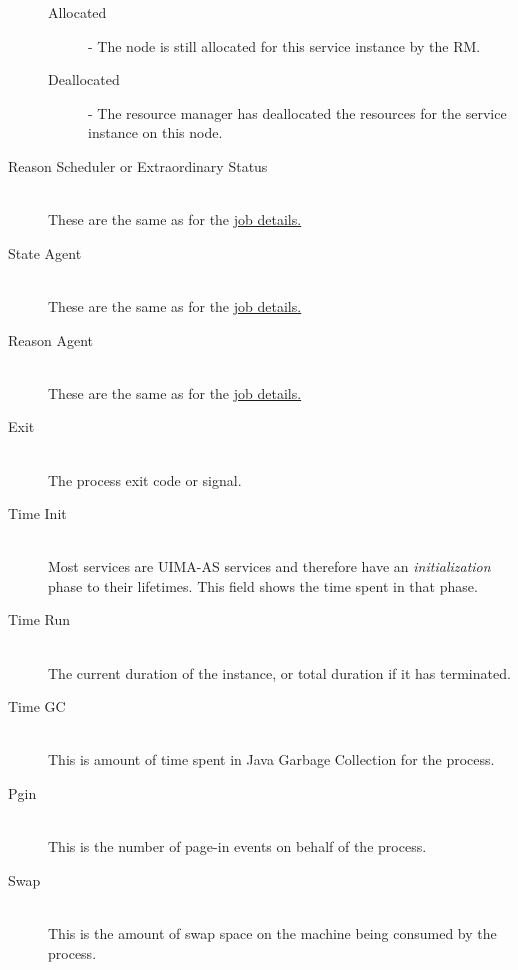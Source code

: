 \begin{description}
        \begin{description}
            \item[Allocated] - The node is still allocated for this service instance by the RM.
            \item[Deallocated] - The resource manager has deallocated the resources for the service instance on
              this node.
        \end{description}
        
      \item[Reason Scheduler or Extraordinary Status] \hfill \\
        These are the same as for the \hyperref[itm:job-details-sched]{job details.}

      \item[State Agent] \hfill \\
        These are the same as for the \hyperref[itm:job-details-state]{job details.}

      \item[Reason Agent] \hfill \\
        These are the same as for the \hyperref[itm:job-details-agent]{job details.}

      \item[Exit] \hfill \\
        The process exit code or signal.

      \item[Time Init] \hfill \\
        Most services are UIMA-AS services and therefore have an {\em initialization} phase
        to their lifetimes.  This field shows the time spent in that phase.

      \item[Time Run] \hfill \\
        The current duration of the instance, or total duration if it has 
        terminated.
        
      \item[Time GC] \hfill \\
        This is amount of time spent in Java Garbage Collection for the process.

      \item[Pgin] \hfill \\
        This is the number of page-in events on behalf of the process.
        
      \item[Swap] \hfill \\
        This is the amount of swap space on the machine being consumed by the process.
        

\end{description}
